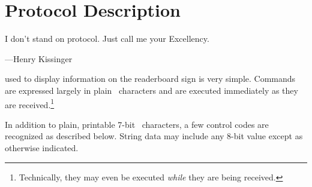                                                       
%
\chapter{Protocol Description}\label{chap:protocol}
{\setlength{\epigraphwidth}{.5\textwidth}
\epigraph{I don't stand on protocol. Just call me your Excellency.}{---Henry Kissinger}}
 used to display information on the readerboard sign is very simple.
Commands are expressed largely in plain \ascii\ characters and are executed immediately
as they are received.\footnote{Technically, they may even be executed \emph{while} they
are being received.}

In addition to plain, printable 7-bit \ascii\ characters, a few control codes are
recognized as described below. String data may include any 8-bit value except as otherwise
indicated.

%
%
%
